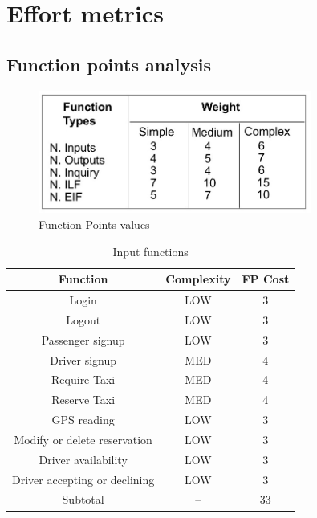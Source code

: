 \chapter{Effort metrics}


\section{Function points analysis}

\begin{figure}
\centering
\includegraphics[width=0.8\textwidth]{tex-images/FPTable}
\caption{Function Points values}
\end{figure}

\begin{table}
\begin{center}
\begin{tabular}{ccc}
\toprule
Function								& Complexity	& FP Cost \\
\midrule
Login									&	LOW	&	3	\\
Logout								&	LOW	&	3	\\
Passenger signup					&	LOW	&	3	\\
Driver signup						&	MED	&	4	\\
Require Taxi						&	MED	&	4	\\
Reserve Taxi						&	MED	&	4	\\
GPS reading							&	LOW	&	3	\\
Modify or delete reservation	&	LOW	&	3	\\
Driver availability				&	LOW	&	3	\\
Driver accepting or declining	&	LOW	&	3	\\
\midrule
Subtotal								&	--		&	33	\\
\bottomrule
\end{tabular}
\caption{Input functions}
\end{center}
\end{table}

